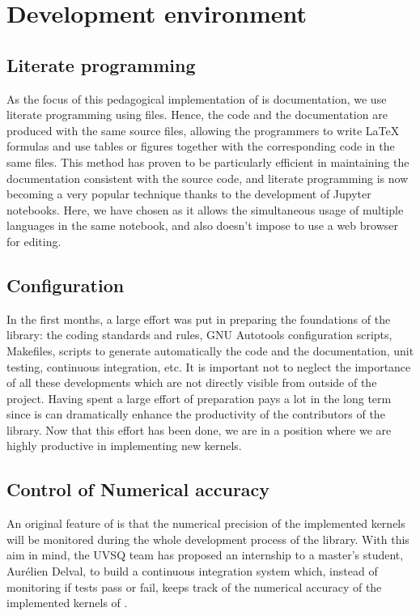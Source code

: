 \section{Development environment}

\subsection{Literate programming}

As the focus of this pedagogical implementation of \QMCkl{} is documentation,
we use literate programming using {\orgmode} files.\cite{schulte_2012,orgmode}
Hence, the code and the documentation are produced with the same
source files, allowing the programmers to write \LaTeX{} formulas and
use tables or figures together with the corresponding code in the same
files.
This method has proven to be particularly efficient in maintaining the
documentation consistent with the source code, and literate
programming is now becoming a very popular technique thanks to the
development of Jupyter notebooks.
Here, we have chosen {\orgmode} as it allows the simultaneous usage of
multiple languages in the same notebook, and also doesn't impose to
use a web browser for editing.

\subsection{Configuration}

In the first months, a large effort was put in preparing the
foundations of the library: the coding standards and rules, GNU Autotools
configuration scripts, Makefiles, scripts to generate automatically
the code and the documentation, unit testing, continuous integration,
etc. It is important not to neglect the importance of all these
developments which are not directly visible from outside of the project.
Having spent a large effort of preparation pays a lot in the long term
since is can dramatically enhance the productivity of the contributors
of the library.
Now that this effort has been done, we are in a position where we are highly
productive in implementing new kernels.

\subsection{Control of Numerical accuracy}

An original feature of \QMCkl{} is that the numerical precision of the
implemented kernels will be monitored during the whole development
process of the library.
With this aim in mind, the \ac{UVSQ} team has proposed an internship
to a master's student, Aurélien Delval, to build a continuous
integration system which, instead of monitoring if tests pass or fail,
keeps track of the numerical accuracy of the implemented kernels of \QMCkl{}.

